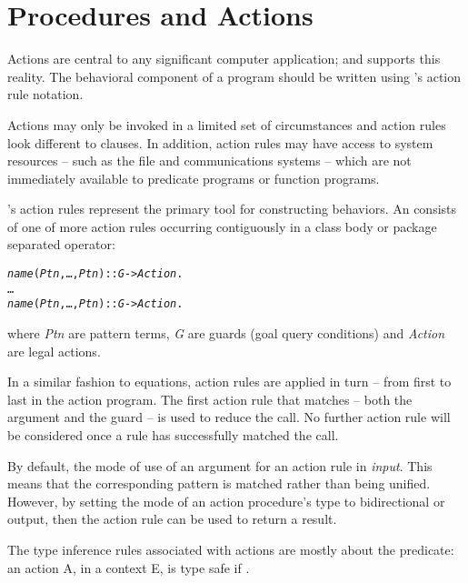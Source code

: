 \chapter{Procedures and Actions}
\label{actions}

Actions are central to any significant computer application; and \go supports this reality. The behavioral component of a \go program should be written using \go's action rule notation.

Actions may only be invoked in a limited set of circumstances and action rules look different to clauses. In addition, action rules may have access to system resources -- such as the file and communications systems -- which are not immediately available to predicate programs or function programs.

\go's action rules represent the primary tool for constructing behaviors. 
An   consists of one of more action rules occurring contiguously in a class body or package separated \dotspace operator:
\begin{alltt}
\emph{name}(\emph{Ptn},\ldots,\emph{Ptn\subn}) :: \emph{G}-> \emph{Action}.
\ldots
\emph{name}(\emph{Ptn},\ldots,\emph{Ptn\subn}) :: \emph{G} -> \emph{Action}.
\end{alltt}
where \emph{Ptn} are pattern terms, \emph{G\subi} are guards (goal query conditions)  and \emph{Action\subi} are legal actions.

In a similar fashion to equations, action rules are applied in turn -- from first to last in the action program. The first action rule that matches -- both the argument and the guard -- is used to reduce the call. No further action rule will be considered once a rule has successfully matched the call.

By default, the mode of use of an argument for an action rule in \emph{input}. This means that the corresponding pattern is matched rather than being unified. However, by setting the mode of an action procedure's type to bidirectional or output, then the action rule can be used to return a result.

The type inference rules associated with actions are mostly about the  predicate: an action A, in a context E, is type safe if .

